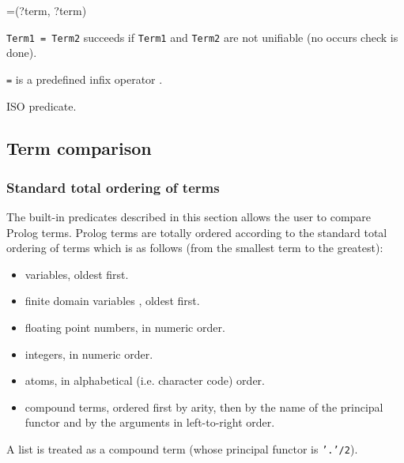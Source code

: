 \begin{TemplatesOneCol}
{\bs}=(?term, ?term)
\end{TemplatesOneCol}

\Description

\texttt{Term1 {\bs}= Term2} succeeds if \texttt{Term1} and \texttt{Term2}
are not unifiable (no occurs check is done). 

\texttt{{\bs}=} is a predefined infix operator .

\PlErrorsNone

\Portability

ISO predicate.

\subsection{Term comparison}

\subsubsection{Standard total ordering of terms}
\label{Standard-total-ordering-of-terms}
The built-in predicates described in this section allows the user to compare
Prolog terms. Prolog terms are totally ordered according to the standard
total ordering of terms which is as follows (from the smallest term to the
greatest):

\begin{itemize}

\item variables, oldest first.

\item finite domain variables , oldest
first.

\item floating point numbers, in numeric order. 

\item integers, in numeric order. 

\item atoms, in alphabetical (i.e. character code) order. 

\item compound terms, ordered first by arity, then by the name of the
principal functor and by the arguments in left-to-right order.

\end{itemize}

A list is treated as a compound term (whose principal functor is
\texttt{'.'/2}).

